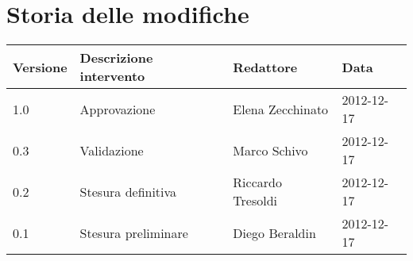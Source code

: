 \newcommand{\docName}{Glossario}
\newcommand{\docFileName}{glossario.tex}
\newcommand{\docVers}{1.0}
\newcommand{\creationDate}{2012-12-17}
\newcommand{\modificationDate}{2012-12-18}
\newcommand{\docState}{Approvato}
\newcommand{\docUsage}{Esterno}
\newcommand{\docAuthors}{Diego Beraldin\\ &Riccardo Tresoldi\\}
\newcommand{\approvedBy}{Elena Zecchinato\\}
\newcommand{\verifiedBy}{Marco Schivo\\}
\newcommand{\docRoot}{..}



\usepackage{fancybox}        %
\setlength{\shadowsize}{2pt} %
\newcommand{\letterbox}[1]{\noindent\shadowbox{\begin{minipage}[t]{.98\linewidth}\centering\large\uppercase{$\mathcal{#1}$}\end{minipage}}\newline}
\newcommand{\glossaryItem}[2]{\noindent\textbf{#1}\newline{}#2\newline}





\section*{Storia delle modifiche}
\begin{tabularx}{\textwidth}{lXll}
\toprule
Versione & Descrizione intervento & Redattore & Data\\
\midrule %
1.0 & Approvazione & Elena Zecchinato & 2012-12-17\\
0.3 & Validazione & Marco Schivo & 2012-12-17\\
0.2 & Stesura definitiva & Riccardo Tresoldi & 2012-12-17\\
0.1 & Stesura preliminare & Diego Beraldin & 2012-12-17\\
\bottomrule
\end{tabularx}
\newpage

